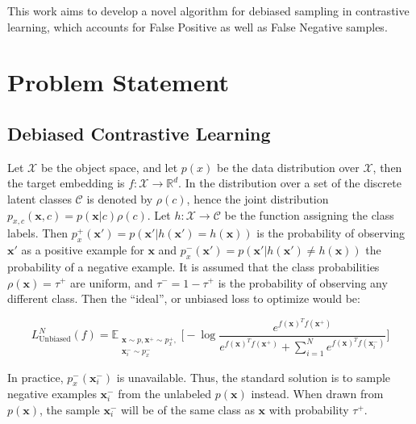 \documentclass{article}
\begin{document}
This work aims to develop a novel algorithm for debiased sampling in contrastive learning, which accounts for False Positive as well as False Negative samples. 


\section{Problem Statement}
\label{sec:headings}

\subsection{Debiased Contrastive Learning}

Let $\mathcal{X}$ be the object space, and let $p(x)$ be the data distribution over $\mathcal{X}$, then the target embedding is $f: \mathcal{X} \rightarrow \mathbb{R}^d$. In \citep{chuang2021debiased} the distribution over a set of the discrete latent classes $\mathcal{C}$ is denoted by $\rho(c)$, hence the joint distribution $p_{x,c}(\textbf{x}, c) = p(\textbf{x}|c)\rho(c)$. Let $h : \mathcal{X} \rightarrow \mathcal{C}$ be the function assigning the class labels. Then $p^+_x(\textbf{x}') = p(\textbf{x}'|h(\textbf{x}') = h(\textbf{x}))$ is the probability of observing $\textbf{x}'$ as a positive example for $\textbf{x}$ and $p^-_x(\textbf{x}') = p(\textbf{x}'|h(\textbf{x}') \neq h(\textbf{x}))$ the probability of a negative example. It is assumed that the class probabilities $\rho(\textbf{x}) = \tau^+$ are uniform, and $\tau^- = 1 - \tau^+$ is the probability of observing any different class. Then the  ``ideal'', or unbiased loss to optimize would be:

\begin{equation}  \label{eq:2}
L_{\text{Unbiased}}^N(f) = \mathbb{E}_{\substack{\textbf{x} \sim p, \textbf{x}^+ \sim p^+_x,\\ \textbf{x}_i^- \sim p_x^-}} \bigg[-\log \frac{e^{f(\textbf{x})^T f(\textbf{x}^+)}}{e^{f(\textbf{x})^T f(\textbf{x}^+)} + \sum _{i=1}^N e^{f(\textbf{x})^T f(\textbf{x}_i^-)}}\bigg]
\end{equation}

In practice, $p_x^-(\textbf{x}_i^-)$ is unavailable. Thus, the standard solution is to sample negative examples $\textbf{x}_i^-$ from the unlabeled $p(\textbf{x})$ instead. When drawn from $p(\textbf{x})$, the sample $\textbf{x}_i^-$ will be of the same class as $\textbf{x}$ with probability $\tau^+$.
\end{document}
